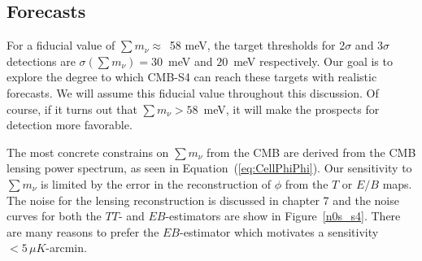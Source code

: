 \subsection{Forecasts}\label{sec:nuforecasts}




For a fiducial value of $\sum m_\nu \approx$~58 meV, the target thresholds for 2$\sigma$ and 3$\sigma$ detections are $\sigma(\sum m_\nu) = 30$~meV and $20$~meV respectively.  Our goal is to explore the degree to which CMB-S4 can reach these targets with realistic forecasts.  We will assume this fiducial value throughout this discussion.  Of course, if it turns out that $\sum m_\nu > 58$~meV, it will make the prospects for detection more favorable.  

The most concrete constrains on $\sum m_\nu$ from the CMB are derived from the CMB lensing power spectrum, as seen in Equation~(\ref{eq:CellPhiPhi}).  Our sensitivity to $\sum m_\nu$ is limited by the error in the reconstruction of $\phi$ from the $T$ or $E/B$ maps.  The noise for the lensing reconstruction is discussed in chapter 7 and the noise curves for both the $TT$- and $EB$-estimators are show in Figure~\ref{n0s_s4}.  There are many reasons to prefer the $EB$-estimator which motivates a sensitivity $< 5 \, \mu K$-arcmin.  


